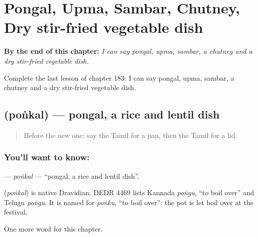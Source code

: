 
\chapter{Pongal, Upma, Sambar, Chutney, Dry stir-fried vegetable dish}
\label{ch:ta-pongal-upma-sambar-chutney-dry-stir-fried-vegetable-dish}

\begin{chapteropening}
\textbf{By the end of this chapter:} \emph{I can say pongal, upma, sambar, a chutney and a dry stir-fried vegetable dish.}

Complete the last lesson of chapter 183: I can say pongal, upma, sambar, a chutney and a dry stir-fried vegetable dish.
\end{chapteropening}

\section[\texorpdfstring{\ta{பொங்கல்} (poṅkal)}{பொங்கல் (poṅkal)}]{ (poṅkal) — pongal, a rice and lentil dish}

\label{lesson:TA-C183-ponkal}



\begin{quote}
Before the new one: say the Tamil for a pan, then the Tamil for a lid.
\end{quote}

\subsection*{You'll want to know: }
\textbf{} — \emph{poṅkal} — \textquotedblleft{}pongal, a rice and lentil dish\textquotedblright{}.

\begin{cousinweb}
\textbf{} (\emph{poṅkal}) is native Dravidian. DEDR 4469 lists Kannada \emph{poṅgu}, \textquotedblleft{}to boil over\textquotedblright{} and Telugu \emph{poṅgu}. It is named for \emph{poṅku}, \textquotedblleft{}to boil over\textquotedblright{}: the pot is let boil over at the festival.
\end{cousinweb}

\begin{grammarlens}[title={What you've built}]
One more word for this chapter.
\end{grammarlens}

